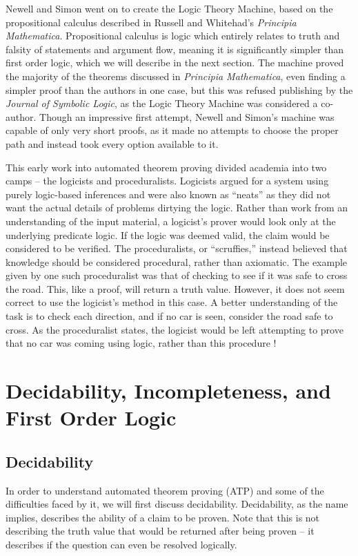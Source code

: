 Newell and Simon went on to create the Logic Theory Machine, based on the propositional calculus described in Russell and Whitehad's \textit{Principia Mathematica}. Propositional calculus is logic which entirely relates to truth and falsity of statements and argument flow, meaning it is significantly simpler than first order logic, which we will describe in the next section. The machine proved the majority of the theorems discussed in \textit{Principia Mathematica}, even finding a simpler proof than the authors in one case, but this was refused publishing by the \textit{Journal of Symbolic Logic}, as the Logic Theory Machine was considered a co-author. Though an impressive first attempt, Newell and Simon's machine was capable of only very short proofs, as it made no attempts to choose the proper path and instead took every option available to it.

This early work into automated theorem proving divided academia into two camps -- the logicists and proceduralists. Logicists argued for a system using purely logic-based inferences and were also known as ``neats'' as they did not want the actual details of problems dirtying the logic. Rather than work from an understanding of the input material, a logicist's prover would look only at the underlying predicate logic. If the logic was deemed valid, the claim would be considered to be verified. The proceduralists, or ``scruffies,'' instead believed that knowledge should be considered procedural, rather than axiomatic. The example given by one such proceduralist was that of checking to see if it was safe to cross the road. This, like a proof, will return a truth value. However, it does not seem correct to use the logicist's method in this case. A better understanding of the task is to check each direction, and if no car is seen, consider the road safe to cross. As the proceduralist states, the logicist would be left attempting to prove that no car was coming using logic, rather than this procedure \cite{history}!

\section{Decidability, Incompleteness, and First Order Logic}
\subsection{Decidability}\label{turingMachine}

In order to understand automated theorem proving (ATP) and some of the difficulties faced by it, we will first discuss decidability. Decidability, as the name implies, describes the ability of a claim to be proven. Note that this is not describing the truth value that would be returned after being proven -- it describes if the question can even be resolved logically. 


